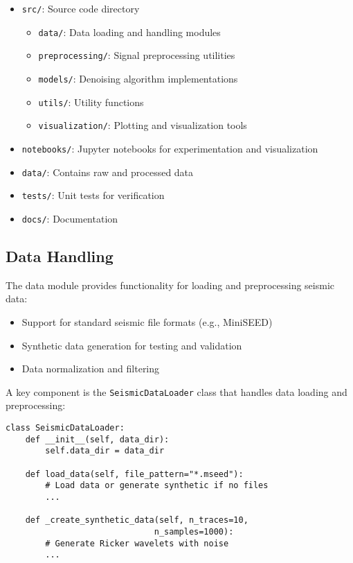 \documentclass[11pt]{article}
\begin{document}
\begin{itemize}
\item \texttt{src/}: Source code directory
  \begin{itemize}
  \item \texttt{data/}: Data loading and handling modules
  \item \texttt{preprocessing/}: Signal preprocessing utilities
  \item \texttt{models/}: Denoising algorithm implementations
  \item \texttt{utils/}: Utility functions
  \item \texttt{visualization/}: Plotting and visualization tools
  \end{itemize}
\item \texttt{notebooks/}: Jupyter notebooks for experimentation and visualization
\item \texttt{data/}: Contains raw and processed data
\item \texttt{tests/}: Unit tests for verification
\item \texttt{docs/}: Documentation
\end{itemize}

\subsection{Data Handling}
The data module provides functionality for loading and preprocessing seismic data:

\begin{itemize}
\item Support for standard seismic file formats (e.g., MiniSEED)
\item Synthetic data generation for testing and validation
\item Data normalization and filtering
\end{itemize}

A key component is the \texttt{SeismicDataLoader} class that handles data loading and preprocessing:

\begin{lstlisting}
class SeismicDataLoader:
    def __init__(self, data_dir):
        self.data_dir = data_dir
        
    def load_data(self, file_pattern="*.mseed"):
        # Load data or generate synthetic if no files
        ...
        
    def _create_synthetic_data(self, n_traces=10, 
                              n_samples=1000):
        # Generate Ricker wavelets with noise
        ...
\end{lstlisting}
\end{document}
